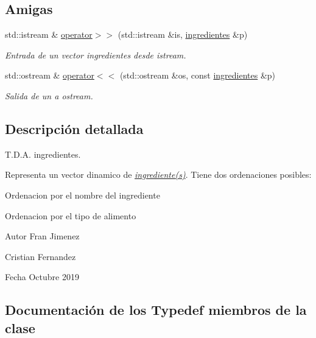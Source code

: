 \subsection*{Amigas}
\begin{DoxyCompactItemize}
\item 
std\+::istream \& \hyperlink{classingredientes_adfbb6b2de8bd8b193715a3d58c313b84}{operator$>$$>$} (std\+::istream \&is, \hyperlink{classingredientes}{ingredientes} \&p)
\begin{DoxyCompactList}\small\item\em Entrada de un vector ingredientes desde istream. \end{DoxyCompactList}\item 
std\+::ostream \& \hyperlink{classingredientes_a47b68f377e21ce26320b8adb9c72f347}{operator$<$$<$} (std\+::ostream \&os, const \hyperlink{classingredientes}{ingredientes} \&p)
\begin{DoxyCompactList}\small\item\em Salida de un a ostream. \end{DoxyCompactList}\end{DoxyCompactItemize}


\subsection{Descripción detallada}
T.\+D.\+A. ingredientes. 

Representa un vector dinamico de {\itshape \hyperlink{classingrediente}{ingrediente(s)}}. Tiene dos ordenaciones posibles\+:


\begin{DoxyItemize}
\item Ordenacion por el nombre del ingrediente
\item Ordenacion por el tipo de alimento
\end{DoxyItemize}

\begin{DoxyAuthor}{Autor}
Fran Jimenez 

Cristian Fernandez 
\end{DoxyAuthor}
\begin{DoxyDate}{Fecha}
Octubre 2019 
\end{DoxyDate}


\subsection{Documentación de los \textquotesingle{}Typedef\textquotesingle{} miembros de la clase}
\mbox{\label{classingredientes_ac84040efbb789929ebe9177605bb890a}} 
